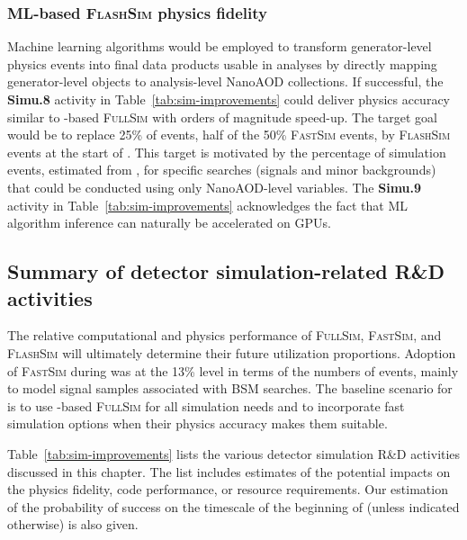 \subsubsection{ML-based \textsc{FlashSim} physics fidelity}

Machine learning algorithms would be employed to transform generator-level physics events into final data products usable in analyses by directly mapping generator-level objects to analysis-level NanoAOD collections. 
If successful, the \textbf{Simu.8} activity in Table~\ref{tab:sim-improvements} could deliver physics accuracy similar to \GEANTfour-based \textsc{FullSim} with orders of magnitude speed-up. 
The target goal would be to replace 25\% of events, half of the 50\% \textsc{FastSim} events, by \textsc{FlashSim} events at the start of \RunFour.
This target is motivated by the percentage of simulation events, estimated from \RunThree, for specific searches (signals and minor backgrounds) that could be conducted using only NanoAOD-level variables.
The \textbf{Simu.9} activity in Table~\ref{tab:sim-improvements} acknowledges the fact that \gls{ML} algorithm inference can naturally be accelerated on \glspl{GPU}.

\subsection{Summary of detector simulation-related R\&D activities} 

The relative computational and physics performance of \textsc{FullSim}, \textsc{FastSim}, and \textsc{FlashSim} will ultimately determine their future utilization proportions. Adoption of \textsc{FastSim} during \RunTwo was at the 13\% level in terms of the numbers of events, mainly to model signal samples associated with \gls{BSM} searches. The baseline scenario for \RunFour is to use \GEANTfour-based \textsc{FullSim} for all simulation needs and to incorporate fast simulation options when their physics accuracy makes them suitable.

Table~\ref{tab:sim-improvements} lists the various detector simulation R\&D activities discussed in this chapter. The list includes estimates of the potential impacts on the physics fidelity, code performance, or resource requirements. Our estimation of the probability of success on the timescale of the beginning of \RunFour (unless indicated otherwise) is also given. 

